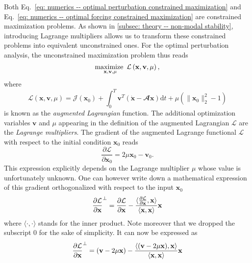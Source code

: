   Both Eq.\ \eqref{eq: numerics -- optimal perturbation constrained maximization} and Eq.\ \eqref{eq: numerics -- optimal forcing constrained maximization} are constrained maximization problems. As shown in \textsection \ref{subsec: theory -- non-modal stability}, introducing Lagrange multipliers allows us to transform these constrained problems into equivalent unconstrained ones. For the optimal perturbation analysis, the unconstrained maximization problem thus reads
  \begin{equation}
    \maximize \limits_{\mathbf{x}, \mathbf{v}, \mu} \mathcal{L} \left( \mathbf{x}, \mathbf{v}, \mu \right),
    \label{eq: numerics -- unconstrained maximization}
  \end{equation}
  where
  \begin{equation}
    \mathcal{L} \left( \mathbf{x}, \mathbf{v}, \mu \right) = \mathcal{J}\left( \mathbf{x}_0 \right) + \int_{0}^T \mathbf{v}^T \left( \dot{\mathbf{x}} - \mathbfcal{A}\mathbf{x} \right) \mathrm{d}t + \mu \left( \| \mathbf{x}_0 \|_2^2 - 1 \right)
    \label{eq: numerics -- augmented Lagrangian}
  \end{equation}
  is known as the \emph{augmented Lagrangian} function. The additional optimization variables $\mathbf{v}$ and $\mu$ appearing in the definition of the augmented Lagrangian $\mathcal{L}$ are the \emph{Lagrange multipliers}. The gradient of the augmented Lagrange functional $\mathcal{L}$ with respect to the initial condition $\mathbf{x}_0$ reads
  \begin{equation}
    \displaystyle \frac{\partial \mathcal{L}}{\partial \mathbf{x}_0} = 2\mu\mathbf{x}_0 - \mathbf{v}_0.
  \end{equation}
  This expression explicitly depends on the Lagrange multiplier $\mu$ whose value is unfortunately unknown. One can however write down a mathematical expression of this gradient orthogonalized with respect to the input $\mathbf{x}_0$
  \begin{equation}
      \frac{\partial \mathcal{L}}{\partial {\bf x}}^{\perp} = \frac{\partial \mathcal{L}}{\partial {\bf x}} - \frac{\langle \frac{\partial \mathcal{L}}{\partial {\bf x}},{\bf x} \rangle}{\langle {\bf x},{\bf x} \rangle}{\bf x}
  \end{equation}
  where $\langle \cdot,\cdot \rangle$ stands for the inner product. Note moreover that we dropped the subscript 0 for the sake of simplicity. It can now be expressed as
  \begin{equation}
      \frac{\partial \mathcal{L}}{\partial {\bf x}}^{\perp} = ({\bf v} - 2\mu {\bf x}) - \frac{\langle ({\bf v} - 2\mu {\bf x}) , {\bf x} \rangle}{\langle {\bf x},{\bf x} \rangle}{\bf x}
  \end{equation}
